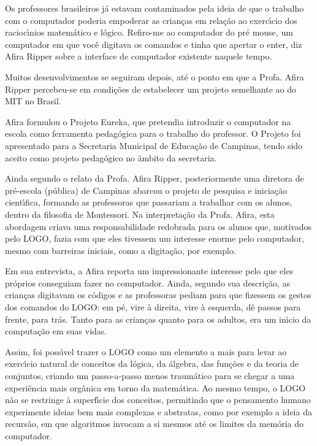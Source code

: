 \documentclass[
12pt,		%
openright,	%
twoside,  %
a4paper,			%
chapter=TITLE,		%
english,			%
french,				%
spanish,			%
brazil				%
]{USPSC-classe/USPSC}
\begin{document}
Os professores brasileiros j\'a estavam contaminados pela ideia de que o trabalho com o computador poderia empoderar as crian\c{c}as em rela\c{c}\~ao ao exerc\'{\i}cio dos racioc\'{\i}nios matem\'atico e l\'ogico. \textquotedbl Refiro-me ao computador do pr\'e mouse, um computador em que voc\^e digitava os comandos e tinha que apertar o enter\textquotedbl , diz Afira Ripper sobre a interface de computador existente naquele tempo.




Muitos desenvolvimentos se seguiram depois, at\'e o ponto em que a Profa. Afira Ripper percebeu-se em condi\c{c}\~oes de estabelecer um projeto semelhante ao do MIT no Brasil.




Afira formulou o Projeto Eureka, que pretendia introduzir o computador na escola como ferramenta pedag\'ogica para o trabalho do professor. O Projeto foi apresentado para a Secretaria Municipal de Educa\c{c}\~ao de Campinas, tendo sido aceito como projeto pedag\'ogico no \^ambito da secretaria.




Ainda segundo o relato da Profa. Afira Ripper, posteriormente uma diretora de pr\'e-escola (p\'ublica) de Campinas abarcou o projeto de pesquisa e inicia\c{c}\~ao cient\'{\i}fica, formando as professoras que passariam a trabalhar com os alunos, dentro da filosofia de Montessori. Na interpreta\c{c}\~ao da Profa. Afira, esta abordagem criava uma responsabilidade redobrada para os alunos que, motivados pelo LOGO, fazia com que eles tivessem um interesse enorme pelo computador, mesmo com barreiras iniciais, como a digita\c{c}\~ao, por exemplo.




Em sua entrevista, a Afira reporta um impressionante interesse pelo que eles pr\'oprios conseguiam fazer no computador. Ainda, segundo sua descri\c{c}\~ao, as crian\c{c}as digitavam os c\'odigos e as professoras pediam para que fizessem os gestos dos comandos do LOGO: \textquotedbl em p\'e\textquotedbl , \textquotedbl vire \`a direita\textquotedbl , \textquotedbl vire \`a esquerda\textquotedbl , \textquotedbl d\^e passos para frente\textquotedbl , \textquotedbl para tr\'as\textquotedbl . Tanto para as crian\c{c}as quanto para os adultos, era um in\'{\i}cio da computa\c{c}\~ao em suas vidas.




Assim, foi poss\'{\i}vel trazer o LOGO como um elemento a mais para levar ao exerc\'{\i}cio natural de conceitos da l\'ogica, da \'algebra, das fun\c{c}\~oes e da teoria de conjuntos, criando um passo-a-passo menos traum\'atico para se chegar a uma experi\^encia mais org\^anica em torno da matem\'atica. Ao mesmo tempo, o LOGO n\~ao se restringe \`a superf\'{\i}cie dos conceitos, permitindo que o pensamento humano experimente ideias bem mais complexas e abstratas, como por exemplo a ideia da recurs\~ao, em que algoritmos invocam a si mesmos at\'e os limites da mem\'oria do computador.
\end{document}

